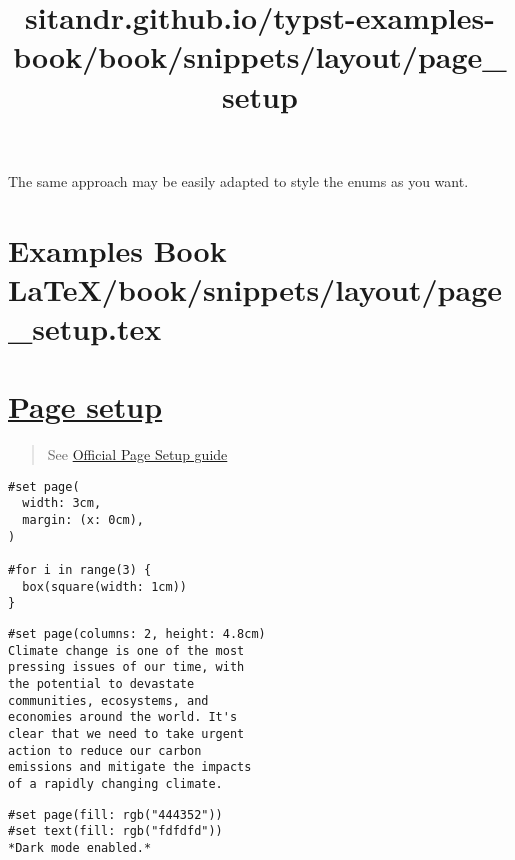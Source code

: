 \pandocbounded{}

The same approach may be easily adapted to style the enums as you want.


\section{Examples Book LaTeX/book/snippets/layout/page_setup.tex}
\title{sitandr.github.io/typst-examples-book/book/snippets/layout/page_setup}

\section{\texorpdfstring{\hyperref[page-setup]{Page
setup}}{Page setup}}\label{page-setup}

\begin{quote}
See \href{https://typst.app/docs/guides/page-setup-guide/}{Official Page
Setup guide}
\end{quote}

\begin{verbatim}
#set page(
  width: 3cm,
  margin: (x: 0cm),
)

#for i in range(3) {
  box(square(width: 1cm))
}
\end{verbatim}

\pandocbounded{}

\begin{verbatim}
#set page(columns: 2, height: 4.8cm)
Climate change is one of the most
pressing issues of our time, with
the potential to devastate
communities, ecosystems, and
economies around the world. It's
clear that we need to take urgent
action to reduce our carbon
emissions and mitigate the impacts
of a rapidly changing climate.
\end{verbatim}

\pandocbounded{}

\begin{verbatim}
#set page(fill: rgb("444352"))
#set text(fill: rgb("fdfdfd"))
*Dark mode enabled.*
\end{verbatim}

\pandocbounded{}

